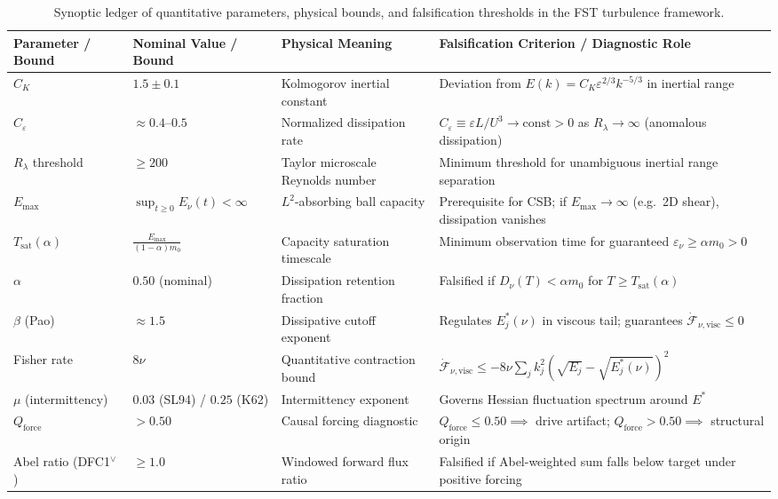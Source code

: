 \documentclass[12pt,a4paper]{article}
\theoremstyle{breakdef}
\theoremstyle{breakplain}
\theoremstyle{breakdef}
\begin{document}
\begin{table}[htbp]
\centering
\footnotesize
\caption{Synoptic ledger of quantitative parameters, physical bounds, and falsification thresholds in the FST turbulence framework.}
\label{tab:parameter-thresholds}
\vspace{4pt}
\setlength{\tabcolsep}{3.5pt}
\renewcommand{\arraystretch}{1.15}
\begin{tabularx}{\textwidth}{>{\raggedright\arraybackslash}p{2.2cm} >{\centering\arraybackslash}p{2.6cm} >{\raggedright\arraybackslash}p{3.2cm} Y}
\toprule
\textbf{Parameter / Bound} & \textbf{Nominal Value / Bound} & \textbf{Physical Meaning} & \textbf{Falsification Criterion / Diagnostic Role} \\
\midrule
$C_K$ & $1.5 \pm 0.1$ & Kolmogorov inertial constant & Deviation from $E(k) = C_K \varepsilon^{2/3} k^{-5/3}$ in inertial range \\
\addlinespace[2pt]
$C_\varepsilon$ & $\approx 0.4$--$0.5$ & Normalized dissipation rate & $C_\varepsilon \equiv \varepsilon L / U^3 \to \mathrm{const} > 0$ as $R_\lambda \to \infty$ (anomalous dissipation) \\
\addlinespace[2pt]
$R_\lambda$ threshold & $\ge 200$ & Taylor microscale Reynolds number & Minimum threshold for unambiguous inertial range separation \\
\addlinespace[2pt]
$E_{\max}$ & $\sup_{t \ge 0} E_\nu(t) < \infty$ & $L^2$-absorbing ball capacity & Prerequisite for CSB; if $E_{\max} \to \infty$ (e.g.\ 2D shear), dissipation vanishes \\
\addlinespace[2pt]
$T_{\mathrm{sat}}(\alpha)$ & $\frac{E_{\max}}{(1-\alpha)m_0}$ & Capacity saturation timescale & Minimum observation time for guaranteed $\varepsilon_\nu \ge \alpha m_0 > 0$ \\
\addlinespace[2pt]
$\alpha$ & $0.50$ (nominal) & Dissipation retention fraction & Falsified if $D_\nu(T) < \alpha m_0$ for $T \ge T_{\mathrm{sat}}(\alpha)$ \\
\addlinespace[2pt]
$\beta$ (Pao) & $\approx 1.5$ & Dissipative cutoff exponent & Regulates $E_j^*(\nu)$ in viscous tail; guarantees $\dot{\mathcal{F}}_{\nu,\mathrm{visc}} \le 0$ \\
\addlinespace[2pt]
Fisher rate & $8\nu$ & Quantitative contraction bound & $\dot{\mathcal{F}}_{\nu,\mathrm{visc}} \le -8\nu \sum_j k_j^2 (\sqrt{E_j} - \sqrt{E_j^*(\nu)})^2$ \\
\addlinespace[2pt]
$\mu$ (intermittency) & $0.03$ (SL94) / $0.25$ (K62) & Intermittency exponent & Governs Hessian fluctuation spectrum around $E^*$ \\
\addlinespace[2pt]
$Q_{\mathrm{force}}$ & $> 0.50$ & Causal forcing diagnostic & $Q_{\mathrm{force}} \le 0.50 \implies$ drive artifact; $Q_{\mathrm{force}} > 0.50 \implies$ structural origin \\
\addlinespace[2pt]
Abel ratio (DFC1$^\vee$) & $\ge 1.0$ & Windowed forward flux ratio & Falsified if Abel-weighted sum falls below target under positive forcing \\
\bottomrule
\end{tabularx}
\end{table}
\end{document}
